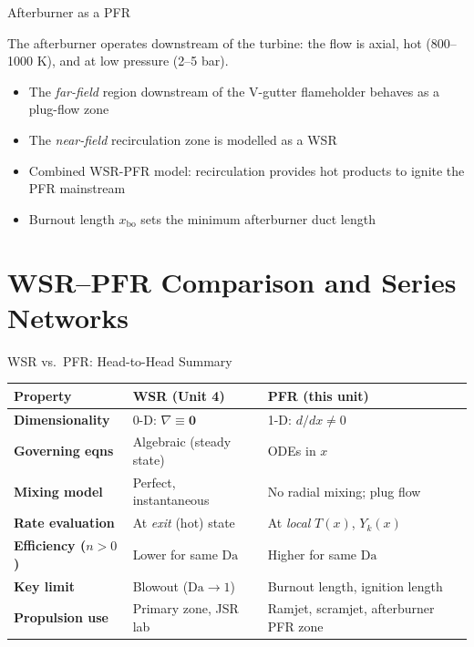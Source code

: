 \documentclass[12pt,aspectratio=169]{beamer}
\newcommand{\Da}{\mathrm{Da}}
\begin{document}
\begin{frame}{Afterburner as a PFR}

The afterburner operates downstream of the turbine: the flow is
axial, hot (800--1000 K), and at low pressure (2--5 bar). 

   \begin{itemize}
        \item The \emph{far-field} region downstream of the
              V-gutter flameholder behaves as a plug-flow zone
        \item The \emph{near-field} recirculation zone is
             modelled as a WSR 
        \item Combined WSR-PFR model: recirculation provides
              hot products to ignite the PFR mainstream
        \item Burnout length $x_{\text{bo}}$ sets the
              minimum afterburner duct length
      \end{itemize}

\end{frame}

\section{WSR--PFR Comparison and Series Networks}

\begin{frame}{WSR vs.\ PFR: Head-to-Head Summary}

  \renewcommand{\arraystretch}{1.5}
  \begin{tabular}{>{\bfseries}p{3.2cm} p{4.5cm} p{4.5cm}}
    \toprule
    Property & WSR (Unit 4) & PFR (this unit) \\
    \midrule
    Dimensionality & 0-D: $\nabla \equiv \mathbf{0}$ &
                     1-D: $d/dx \neq 0$ \\
    Governing eqns & Algebraic (steady state) &
                     ODEs in $x$ \\
    Mixing model   & Perfect, instantaneous &
                     No radial mixing; plug flow \\
    Rate evaluation & At \emph{exit} (hot) state &
                     At \emph{local} $T(x)$, $Y_k(x)$ \\
    Efficiency ($n>0$) & Lower for same $\Da$ &
                     Higher for same $\Da$ \\
    Key limit      & Blowout ($\Da \to 1$) &
                     Burnout length, ignition length \\
    Propulsion use & Primary zone, JSR lab &
                     Ramjet, scramjet, afterburner PFR zone \\
    \bottomrule
  \end{tabular}
\end{frame}
\end{document}
